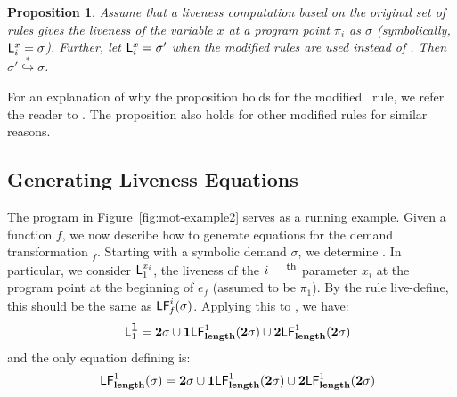 \documentclass[9pt]{sigplanconf}
\newtheorem{proposition}[theorem]{Proposition}
\begin{document}
\begin{proposition}
Assume that a liveness computation  based on the original set of rules
gives the liveness  of the variable $x$ at a  program point $\pi_i$ as
$\sigma$   (symbolically,   $\mathsf{L}_{{i}}^{x}=   \sigma$).   Further,   let
$\mathsf{L}_{{i}}^{x}=  \sigma'$ when the  modified rules  are used  instead of
\Lfunonly.  Then $\sigma' \stackrel{*}{\hookrightarrow} \sigma$.
\end{proposition}

For  an explanation  of why  the  proposition holds  for the  modified
\CONS\  rule,   we  refer   the  reader  to   \cite{asati14lgc}.   The
proposition also holds for other modified rules for similar reasons.


\newcommand{\emm}[2]{\ensuremath{\mathcal{#1}_{#2}}}

\subsection{Generating Liveness Equations}
The  program  in  Figure~\ref{fig:mot-example2}  serves as  a  running
example.   Given a  function $\mathit{f}$,  we now  describe  how to
generate    equations    for     the    demand    transformation
\Lfonly$_\mathit{f}$.   Starting with a  symbolic demand  $\sigma$, we
determine  .  In  particular, we
consider $\mathsf{L}_{{1}}^{x_i}$,  the  liveness of    the
$i^{\mbox{\footnotesize  th}}$
parameter $x_i$ at the  program point at the  beginning of
$e_{\mathit{f}}$ (assumed  to be  $\pi_1$). By the rule {\sc
  live-define}, this should be the
same as $\mathsf{LF}_{\mathit f}^{i}( {\mathit \sigma})$. Applying this to  \length, we have:
\begin{eqnarray*}
&& \mathsf{L}_{{1}}^{\mbox{\tt l}} = {\mathbf{2}}\sigma \cup \mathbf{1}\mathsf{LF}_{\mathit {\mathbf{length}}}^{1}( {\mathit {{\mathbf{2}}}\sigma})
  \cup {\mathbf{2}}\mathsf{LF}_{\mathit {\mathbf{length}}}^{1}( {\mathit {{\mathbf{2}}}\sigma})
\end{eqnarray*}
and  the only equation defining \Lfone{\length} is:
  \begin{eqnarray*}
   && \mathsf{LF}_{\mathit {\mathbf{length}}}^{1}( {\mathit \sigma})
    =  {\mathbf{2}}\sigma \cup \mathbf{1}\mathsf{LF}_{\mathit {\mathbf{length}}}^{1}( {\mathit {{\mathbf{2}}}\sigma}) \cup
{\mathbf{2}}\mathsf{LF}_{\mathit {\mathbf{length}}}^{1}( {\mathit {{\mathbf{2}}}\sigma})
\end{eqnarray*}
\end{document}
